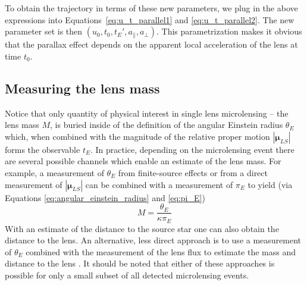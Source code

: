 \documentclass[12pt,dvipsnames]{report}
\begin{document}
To obtain the trajectory in terms of these new parameters, we plug in the above expressions
into Equations~\ref{eq:u_t_parallel1} and \ref{eq:u_t_parallel2}.
The new parameter set is then $\left(u_0,t_0,t_E',a_\parallel,a_\bot\right)$. This parametrization makes it obvious that the parallax
effect depends on the apparent local acceleration of the lens at time $t_0$.

\subsection{Measuring the lens mass}
Notice that only quantity of physical interest in single lens microlensing --
the lens mass $M$, is buried inside of the definition of the angular Einstein
radius $\theta_E$ which, when combined with the magnitude of the relative
proper motion $|\boldsymbol\mu_{LS}|$ forms the observable $t_E$. In practice,
depending on the microlensing event there are several possible channels which
enable an estimate of the lens mass. For example, a measurement of $\theta_E$
from finite-source effects or from a direct measurement of
$|\boldsymbol\mu_{LS}|$ can be combined with a measurement of $\pi_E$ to yield
(via Equations \ref{eq:angular_einstein_radius} and \ref{eq:pi_E})
\begin{equation}
    M = \frac{\theta_E}{\kappa \pi_E}
\end{equation}
With an estimate of the distance to the source star one can also obtain the distance
to the lens.
An alternative, less direct approach is to use a measurement of $\theta_E$ combined
with the measurement of the lens flux to estimate the mass and distance to the lens
\citep{2007ApJ...660..781B}.
It should be noted that either of these approaches is possible for only a small subset
of all detected microlensing events.
\end{document}
